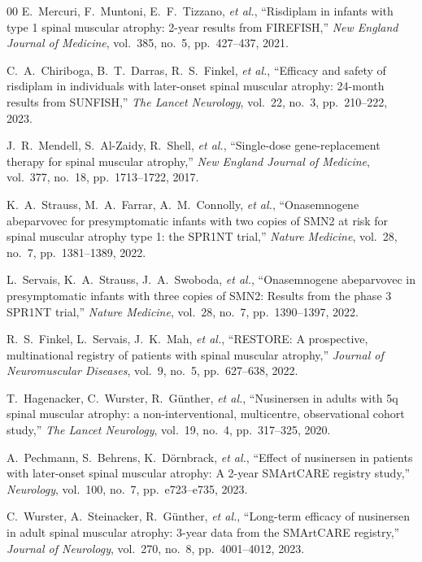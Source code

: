 \documentclass[journal]{IEEEtran}
\begin{document}
\begin{thebibliography}{00}
E.~Mercuri, F.~Muntoni, E.~F.~Tizzano, \textit{et al.}, ``Risdiplam in infants with type 1 spinal muscular atrophy: 2-year results from FIREFISH,'' \textit{New England Journal of Medicine}, vol.~385, no.~5, pp.~427--437, 2021.

C.~A.~Chiriboga, B.~T.~Darras, R.~S.~Finkel, \textit{et al.}, ``Efficacy and safety of risdiplam in individuals with later-onset spinal muscular atrophy: 24-month results from SUNFISH,'' \textit{The Lancet Neurology}, vol.~22, no.~3, pp.~210--222, 2023.

J.~R.~Mendell, S.~Al-Zaidy, R.~Shell, \textit{et al.}, ``Single-dose gene-replacement therapy for spinal muscular atrophy,'' \textit{New England Journal of Medicine}, vol.~377, no.~18, pp.~1713--1722, 2017.

K.~A.~Strauss, M.~A.~Farrar, A.~M.~Connolly, \textit{et al.}, ``Onasemnogene abeparvovec for presymptomatic infants with two copies of SMN2 at risk for spinal muscular atrophy type 1: the SPR1NT trial,'' \textit{Nature Medicine}, vol.~28, no.~7, pp.~1381--1389, 2022.

L.~Servais, K.~A.~Strauss, J.~A.~Swoboda, \textit{et al.}, ``Onasemnogene abeparvovec in presymptomatic infants with three copies of SMN2: Results from the phase 3 SPR1NT trial,'' \textit{Nature Medicine}, vol.~28, no.~7, pp.~1390--1397, 2022.

R.~S.~Finkel, L.~Servais, J.~K.~Mah, \textit{et al.}, ``RESTORE: A prospective, multinational registry of patients with spinal muscular atrophy,'' \textit{Journal of Neuromuscular Diseases}, vol.~9, no.~5, pp.~627--638, 2022.

T.~Hagenacker, C.~Wurster, R.~G\"unther, \textit{et al.}, ``Nusinersen in adults with 5q spinal muscular atrophy: a non-interventional, multicentre, observational cohort study,'' \textit{The Lancet Neurology}, vol.~19, no.~4, pp.~317--325, 2020.

A.~Pechmann, S.~Behrens, K.~D\"ornbrack, \textit{et al.}, ``Effect of nusinersen in patients with later-onset spinal muscular atrophy: A 2-year SMArtCARE registry study,'' \textit{Neurology}, vol.~100, no.~7, pp.~e723--e735, 2023.

C.~Wurster, A.~Steinacker, R.~G\"unther, \textit{et al.}, ``Long-term efficacy of nusinersen in adult spinal muscular atrophy: 3-year data from the SMArtCARE registry,'' \textit{Journal of Neurology}, vol.~270, no.~8, pp.~4001--4012, 2023.


\end{thebibliography}
\end{document}
